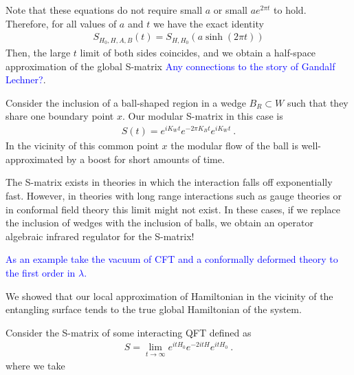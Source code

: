 \documentclass[a4paper,11pt]{article}
\theoremstyle{definition}
\newcommand{\NL}[1]{\textcolor{blue}{#1}}
\begin{document}
Note that these equations do not require small $a$ or small $ae^{2\pi t}$ to hold. Therefore, for all values of $a$ and $t$ we have the exact identity
\begin{eqnarray}
S_{H_0,H,A,B}(t)=S_{H,H_0}(a \sinh(2\pi t)) 
\end{eqnarray} 
Then, the large $t$ limit of both sides coincides, and we obtain a half-space approximation of the global S-matrix \NL{Any connections to the story of Gandalf Lechner?}.

Consider the inclusion of a ball-shaped region in a wedge $B_R\subset W$ such that they share one boundary point $x$. Our modular S-matrix in this case is
\begin{eqnarray}
S(t)=e^{i K_W t} e^{-2\pi K_B t} e^{i K_W t}\ .
\end{eqnarray}
In the vicinity of this common point $x$ the modular flow of the ball is well-approximated by a boost for short amounts of time. 


The S-matrix exists in theories in which the interaction falls off exponentially fast. However, in theories with long range interactions such as gauge theories or in conformal field theory this limit might not exist. In these cases, if we replace the inclusion of wedges with the inclusion of balls, we obtain an operator algebraic infrared regulator for the S-matrix!

\NL{As an example take the vacuum of CFT and a conformally deformed theory to the first order in $\lambda$.}





We showed that our local approximation of Hamiltonian in the vicinity of the entangling surface tends to the true global Hamiltonian of the system. 

Consider the S-matrix of some interacting QFT defined as
\begin{eqnarray}
S=\lim_{t\to \infty} e^{i t H_0}e^{-2i t H}e^{it H_0}\ .
\end{eqnarray}
where we take




\end{document}
